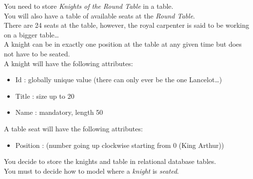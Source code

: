 
\pgfmathsetmacro{}

\noindent You need to store \textit{Knights of the Round Table} in a table.\\
\noindent You will also have a table of available seats at the \textit{Round Table}.\\
\noindent There are 24 seats at the table, however, the royal carpenter is said to be working on a bigger table\ldots\\
\noindent A knight can be in exactly one position at the table at any given time but does not have to be seated.\\
\noindent A knight will have the following attributes:
\begin{itemize}
	\item Id : globally unique value (there can only ever be the one Lancelot\ldots)
	\item Title : size up to 20
	\item Name : mandatory, length 50
\end{itemize}
\noindent A table seat will have the following attributes:
\begin{itemize}
	\item Position : (number going up clockwise starting from 0 (King Arthur))
\end{itemize}
\noindent You decide to store the knights and table in relational database tables.\\
\noindent You must to decide how to model where a \textit{knight} is \textit{seated}.


